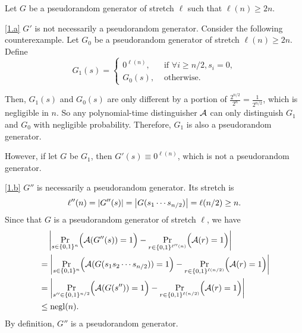 \documentclass{homework}
\begin{document}
\begin{problem}
  Let $G$ be a pseudorandom generator of stretch $\ell$ such that $\ell(n) \ge 2n$.
\end{problem}

\begin{solution}

  \ref{1.a}
  $G'$ is not necessarily a pseudorandom generator. Consider the following
  counterexample. Let $G_0$ be a pseudorandom generator of stretch $\ell(n) \ge 2n$.
  Define
  \begin{equation*}
    G_1(s) = \begin{cases}
      0^{\ell(n)}, & \text{ if } \forall i \ge n/2, s_i = 0, \\
      G_0(s), & \text{ otherwise}.
    \end{cases}
  \end{equation*}

  Then, $G_1(s)$ and $G_0(s)$ are only different by a portion of
  $\frac{2^{n/2}}{2^n} = \frac{1}{2^{n/2}}$, which is negligible in $n$.
  So any polynomial-time distinguisher $\mathcal{A}$ can only distinguish $G_1$ and $G_0$
  with negligible probability. Therefore, $G_1$ is also a pseudorandom generator.

  However, if let $G$ be $G_1$, then $G'(s) \equiv 0^{\ell(n)}$, which is not a
  pseudorandom generator.

  \ref{1.b}
  $G''$ is necessarily a pseudorandom generator. Its stretch is
  \begin{equation*}
    \ell''(n) = \left\lvert G''(s) \right\rvert = \left\lvert G(s_{1} \cdots s_{n/2}) \right\rvert = \ell(n/2) \ge n.
  \end{equation*}
  Since that $G$ is a pseudorandom generator of stretch $\ell$, we have
  \begin{align*}
    & \quad \left\lvert \Pr_{s \in \{0, 1\}^n} \Bigl(\mathcal{A}(G''(s)) = 1\Bigr) - \Pr_{r \in \{0, 1\}^{\ell''(n)}}\Bigl(\mathcal{A}(r) = 1\Bigr) \right\rvert \\
    & = \left\lvert \Pr_{s \in \{0, 1\}^n} \Bigl(\mathcal{A}(G(s_1 s_2 \cdots s_{n/2})) = 1\Bigr) - \Pr_{r \in \{0, 1\}^{\ell(n/2)}}\Bigl(\mathcal{A}(r) = 1\Bigr) \right\rvert \\
    & = \left\lvert \Pr_{s'' \in \{0, 1\}^{n/2}} \Bigl(\mathcal{A}(G(s'')) = 1\Bigr) - \Pr_{r \in \{0, 1\}^{\ell(n/2)}}\Bigl(\mathcal{A}(r) = 1\Bigr) \right\rvert \\
    & \le \mathrm{negl}(n).
  \end{align*}
  By definition, $G''$ is a pseudorandom generator.

\end{solution}
\end{document}
